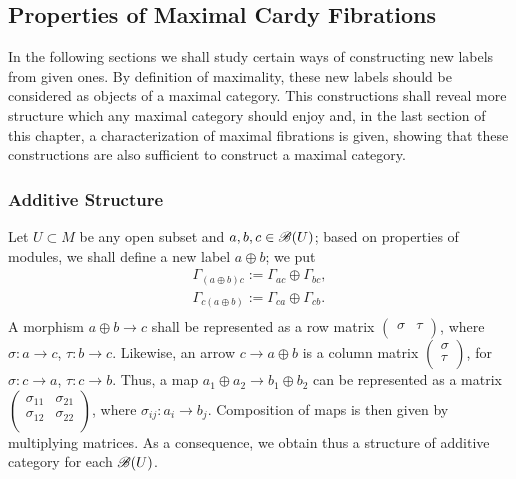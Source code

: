 \subsection{Properties of Maximal Cardy Fibrations}
\label{maximal_cardy_fibrations}

In the following sections we shall study certain ways of constructing new labels from given ones. By definition of maximality, these new labels should be considered as objects of a maximal category. This constructions shall reveal more structure which any maximal category should enjoy and, in the last section of this chapter, a characterization of maximal fibrations is given, showing that these constructions are also sufficient to construct a maximal category.


\subsubsection{Additive Structure}

Let $U\subset M$ be any open subset and $a,b,c\in \mathscr{B}(U)$; based on properties of modules, we shall define a new label $a\oplus b$; we put
$$
\begin{aligned}
\Gamma_{(a\oplus b)c}:=\Gamma_{ac}\oplus \Gamma_{bc}, \\
\Gamma_{c(a\oplus b)}:=\Gamma_{ca}\oplus \Gamma_{cb}.\\
\end{aligned}
$$
A morphism $a\oplus b\to c$ shall be represented as a row matrix $\left ( \begin{smallmatrix} \sigma & \tau \\ \end{smallmatrix} \right )$, where $\sigma :a\to c$, $\tau :b\to c$. Likewise, an arrow $c\to a\oplus b$ is a column matrix $\left ( \begin{smallmatrix} \sigma \\ \tau \\ \end{smallmatrix} \right )$, for $\sigma :c\to a$, $\tau :c\to b$. Thus, a map $a_1\oplus a_2\to b_1\oplus b_2$ can be represented as a matrix $\left (\begin{smallmatrix} \sigma_{11} & \sigma_{21} \\ \sigma_{12} & \sigma_{22} \\ \end{smallmatrix} \right )$, where $\sigma_{ij}:a_i\to b_j$. Composition of maps is then given by multiplying matrices. As a consequence, we obtain thus a structure of additive category for each $\mathscr{B}(U)$.

